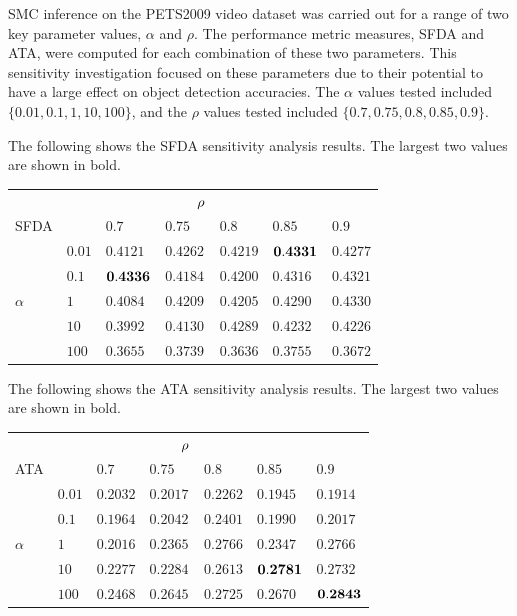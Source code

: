 \documentclass[twocolumn, final]{svjour3}
\begin{document}
SMC inference on the PETS2009 video dataset was carried out for a range of two key parameter values, $\alpha$ and $\rho$. The performance metric measures, SFDA and ATA, were computed for each combination of these two parameters. This sensitivity investigation focused on these parameters due to their potential to have a large effect on object detection accuracies. The $\alpha$ values tested included $\{ 0.01, 0.1, 1, 10, 100 \}$, and the $\rho$ values tested included $\{ 0.7, 0.75, 0.8, 0.85, 0.9 \}$.

The following shows the SFDA sensitivity analysis results. The largest two values are shown in bold.
\begin{center}
\begin{tabular}[!]{l l  l  l  l  l  l}
  & & & $\hspace{8mm}\rho$ & & & \\
  SFDA  &  	& $0.7$ & $0.75$ & $0.8$ & $0.85$ & $0.9$  \\  
  &$0.01$ 	& $0.4121$ & $0.4262$ & $0.4219$ & $\bold{0.4331}$ & $0.4277$  \\
  &$0.1$  	& $\bold{0.4336}$ & $0.4184$ & $0.4200$ & $0.4316$ & $0.4321$  \\ 
$\alpha$ 	& $1$    & $0.4084$ & $0.4209$ & $0.4205$ & $0.4290$ & $0.4330$  \\  
  &$10$   	& $0.3992$ & $0.4130$ & $0.4289$ & $0.4232$ & $0.4226$  \\  
  &$100$  	& $0.3655$ & $0.3739$ & $0.3636$ & $0.3755$ & $0.3672$  \\
\end{tabular}
\end{center}

The following shows the ATA sensitivity analysis results. The largest two values are shown in bold.
\begin{center}
\begin{tabular}[!]{l l  l  l  l  l  l}
		& & & $\hspace{8mm}\rho$ & & & \\
 	 ATA  & 	 	& $0.7$ & $0.75$ & $0.8$ & $0.85$ & $0.9$  \\  
	  &$0.01$ 		& $0.2032$ & $0.2017$ & $0.2262$ & $0.1945$ & $0.1914$  \\
		  &$0.1$ 	& $0.1964$ & $0.2042$ & $0.2401$ & $0.1990$ & $0.2017$  \\
$\alpha$ & $1$  	& $0.2016$ & $0.2365$ & $0.2766$ & $0.2347$ & $0.2766$  \\   
  		&$10$   	& $0.2277$ & $0.2284$ & $0.2613$ & $\bold{0.2781}$ & $0.2732$  \\  
 		 &$100$ 	& $0.2468$ & $0.2645$ & $0.2725$ & $0.2670$ & $\bold{0.2843}$  \\
\end{tabular}
\end{center}
\end{document}
